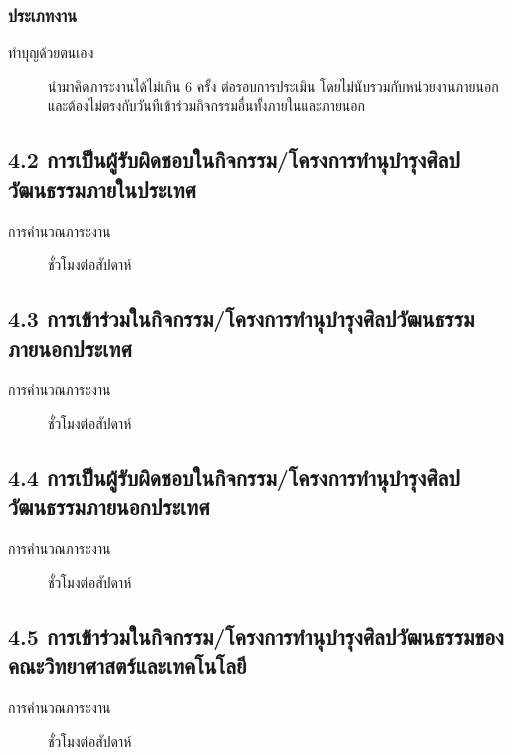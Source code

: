 \documentclass[a4paper,12pt,english]{sphinxmanual}
\begin{document}
\subsubsection{ประเภทงาน}
\label{\detokenize{workload_rubric:id78}}\begin{description}
\item[{ทำบุญด้วยตนเอง}] \leavevmode
นำมาคิดภาระงานได้ไม่เกิน 6 ครั้ง ต่อรอบการประเมิน โดยไม่นับรวมกับหน่วยงานภายนอก และต้องไม่ตรงกับวันทีเข้าร่วมกิจกรรมอื่นทั้งภายในและภายนอก

\end{description}


\subsection{4.2 การเป็นผู้รับผิดชอบในกิจกรรม/โครงการทำนุบำรุงศิลปวัฒนธรรมภายในประเทศ}
\label{\detokenize{workload_rubric:id79}}\label{\detokenize{workload_rubric:id80}}\begin{description}
\item[{การคำนวณภาระงาน}]  ชั่วโมงต่อสัปดาห์

\end{description}


\subsection{4.3 การเข้าร่วมในกิจกรรม/โครงการทำนุบำรุงศิลปวัฒนธรรมภายนอกประเทศ}
\label{\detokenize{workload_rubric:id81}}\label{\detokenize{workload_rubric:id82}}\begin{description}
\item[{การคำนวณภาระงาน}]  ชั่วโมงต่อสัปดาห์

\end{description}


\subsection{4.4 การเป็นผู้รับผิดชอบในกิจกรรม/โครงการทำนุบำรุงศิลปวัฒนธรรมภายนอกประเทศ}
\label{\detokenize{workload_rubric:id83}}\label{\detokenize{workload_rubric:id84}}\begin{description}
\item[{การคำนวณภาระงาน}]  ชั่วโมงต่อสัปดาห์

\end{description}


\subsection{4.5 การเข้าร่วมในกิจกรรม/โครงการทำนุบำรุงศิลปวัฒนธรรมของคณะวิทยาศาสตร์และเทคโนโลยี}
\label{\detokenize{workload_rubric:id85}}\label{\detokenize{workload_rubric:id86}}\begin{description}
\item[{การคำนวณภาระงาน}]  ชั่วโมงต่อสัปดาห์

\end{description}
\end{document}
